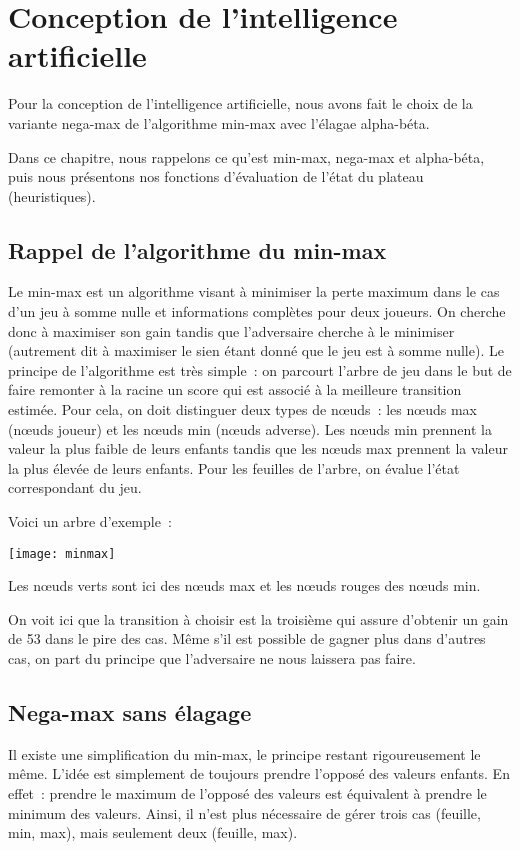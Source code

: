 \chapter{Conception de l'intelligence artificielle} \label{chapter:intelligence-artificielle}

Pour la conception de l'intelligence artificielle, nous avons fait le choix de la variante nega-max de l'algorithme min-max
avec l'élagae alpha-béta.

Dans ce chapitre, nous rappelons ce qu'est min-max, nega-max et alpha-béta, puis nous présentons nos fonctions d'évaluation
de l'état du plateau (heuristiques).

\section{Rappel de l'algorithme du min-max}

Le min-max est un algorithme visant à minimiser la perte maximum dans le cas d'un jeu à somme nulle
et informations complètes pour deux joueurs. On cherche donc à
maximiser son gain tandis que l'adversaire cherche à le minimiser (autrement dit à maximiser le
sien étant donné que le jeu est à somme nulle).
Le principe de l'algorithme est très simple : on parcourt l'arbre de jeu dans le but de faire remonter
à la racine un score qui est associé à la meilleure transition estimée.
Pour cela, on doit distinguer deux types de nœuds : les nœuds max (nœuds joueur) et les nœuds min (nœuds adverse).
Les nœuds min prennent la valeur la plus faible de leurs enfants tandis que les nœuds max prennent la valeur la
plus élevée de leurs enfants.
Pour les feuilles de l'arbre, on évalue l'état correspondant du jeu.

Voici un arbre d'exemple :

\texttt{[image: minmax]}

Les nœuds verts sont ici des nœuds max et les nœuds rouges des nœuds min.

On voit ici que la transition à choisir est la troisième qui assure d'obtenir un gain de 53 dans le pire des cas.
Même s'il est possible de gagner plus dans d'autres cas, on part du principe que l'adversaire ne nous laissera pas faire.

\section{Nega-max sans élagage}

Il existe une simplification du min-max, le principe restant rigoureusement le même.
L'idée est simplement de toujours prendre l'opposé des valeurs enfants.
En effet : prendre le maximum de l'opposé des valeurs est équivalent à prendre le minimum des valeurs.
Ainsi, il n'est plus nécessaire de gérer trois cas (feuille, min, max), mais seulement deux (feuille, max).


